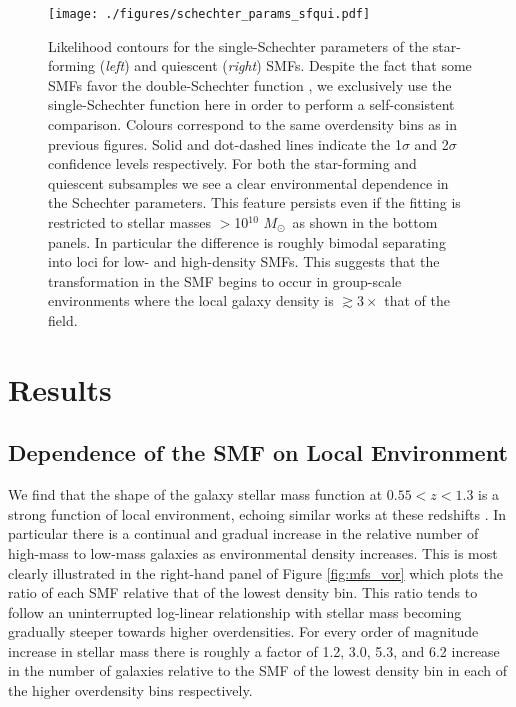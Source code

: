 \documentclass[a4paper,fleqn,usenatbib]{mnras}
\def\z{redshift}
\def\msol{$M_{\odot}$}
\begin{document}
\begin{figure*}
	\texttt{[image: ./figures/schechter\_params\_sfqui.pdf]}
	\caption{
	Likelihood contours for the single-Schechter parameters of the star-forming ({\it left}) and quiescent ({\it right}) SMFs.
	Despite the fact that some SMFs favor the double-Schechter function \citep[e.g.][]{Drory2009, Muzzin2013a, Tomczak2014, Mortlock2015}, we exclusively use the single-Schechter function here in order to perform a self-consistent comparison.
	Colours correspond to the same overdensity bins as in previous figures.
	Solid and dot-dashed lines indicate the 1$\sigma$ and 2$\sigma$ confidence levels respectively.
	For both the star-forming and quiescent subsamples we see a clear environmental dependence in the Schechter parameters.
	This feature persists even if the fitting is restricted to stellar masses $>$10$^{10}$ \msol\ as shown in the bottom panels.
	In particular the difference is roughly bimodal separating into loci for low- and high-density SMFs.
	This suggests that the transformation in the SMF begins to occur in group-scale environments where the local galaxy density is $\gtrsim3\times$ that of the field.
	}
	\label{fig:schechter_params}
\end{figure*}



\section{Results}
\label{sec:results}

\subsection{Dependence of the SMF on Local Environment}
\label{sec:smfs_tot}


We find that the shape of the galaxy stellar mass function at $0.55 < z < 1.3$ is a strong function of local environment, echoing similar works at these \z s \citep{Bolzonella2010, Vulcani2012, vanderBurg2013, Mortlock2015, Davidzon2016}.
In particular there is a continual and gradual increase in the relative number of high-mass to low-mass galaxies as environmental density increases.
This is most clearly illustrated in the right-hand panel of Figure \ref{fig:mfs_vor} which plots the ratio of each SMF relative that of the lowest density bin.
This ratio tends to follow an uninterrupted log-linear relationship with stellar mass becoming gradually steeper towards higher overdensities.
For every order of magnitude increase in stellar mass there is roughly a factor of 1.2, 3.0, 5.3, and 6.2 increase in the number of galaxies relative to the SMF of the lowest density bin in each of the higher overdensity bins respectively.
\end{document}
